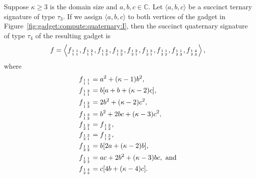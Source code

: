 \documentclass[11pt]{article}
\newcommand{\subMat}[4]{\mbox{\scriptsize $\begin{smallmatrix} #1 & #4 \\ #2 & #3 \end{smallmatrix}$}}
\begin{document}
\begin{lemma} \label{lem:compute:quaternary:I}
 Suppose $\kappa \ge 3$ is the domain size and $a,b,c \in \mathbb{C}$.
 Let $\langle a,b,c \rangle$ be a succinct ternary signature of type $\tau_3$.
 If we assign $\langle a,b,c \rangle$ to both vertices of the gadget in Figure~\ref{fig:gadget:compute:quaternary:I},
 then the succinct quaternary signature of type $\tau_4$ of the resulting gadget is
 \[
  f =
  \left\langle
   f_{\subMat{1}{1}{1}{1}},
   f_{\subMat{1}{1}{1}{2}},
   f_{\subMat{1}{1}{2}{2}},
   f_{\subMat{1}{1}{2}{3}},
   f_{\subMat{1}{2}{1}{2}},
   f_{\subMat{1}{2}{1}{3}},
   f_{\subMat{1}{2}{2}{1}},
   f_{\subMat{1}{2}{3}{1}},
   f_{\subMat{1}{2}{3}{4}}
  \right\rangle,
 \]
 where
 \begin{align*}
  f_{\subMat{1}{1}{1}{1}} &= a^2 + (\kappa - 1) b^2,\\
  f_{\subMat{1}{1}{1}{2}} &= b [a + b + (\kappa - 2) c],\\
  f_{\subMat{1}{1}{2}{2}} &= 2 b^2 + (\kappa - 2) c^2,\\
  f_{\subMat{1}{1}{2}{3}} &= b^2 + 2 b c + (\kappa - 3) c^2,\\
  f_{\subMat{1}{2}{1}{2}} &= f_{\subMat{1}{1}{2}{2}},\\
  f_{\subMat{1}{2}{1}{3}} &= f_{\subMat{1}{1}{2}{3}},\\
  f_{\subMat{1}{2}{2}{1}} &= b [2 a + (\kappa - 2) b],\\
  f_{\subMat{1}{2}{3}{1}} &= a c + 2 b^2 + (\kappa - 3) b c, \text{ and}\\
  f_{\subMat{1}{2}{3}{4}} &= c [4 b + (\kappa - 4) c].
 \end{align*}
\end{lemma}
\end{document}
